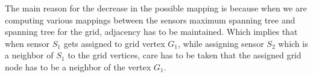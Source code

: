 The main reason for the decrease in the possible mapping is because when we are computing various mappings between the sensors maximum spanning tree and spanning tree for the grid, adjacency has to be maintained. Which implies that when sensor $S_1$ gets assigned to grid vertex $G_1$, while assigning sensor $S_2$ which is a neighbor of $S_1$ to the grid vertices, care has to be taken that the assigned grid node has to be a neighbor of the vertex $G_1$.
















